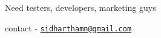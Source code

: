 Need testers, developers, marketing guys \par
 contact -\/ \href{mailto:sidharthamn@gmail.com}{\tt sidharthamn@gmail.\-com} 